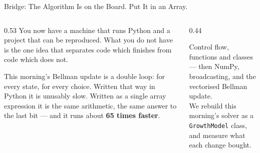 \begin{frame}{Bridge: The Algorithm Is on the Board. Put It in an Array.}
\begin{columns}[T]
\begin{column}{0.53\textwidth}
\small
You now have a machine that runs Python and a project that can be reproduced. What you do not have is the one idea that separates code which finishes from code which does not.
\medskip

This morning's Bellman update is a double loop: for every state, for every choice. Written that way in Python it is unusably slow. Written as a single array expression it is the same arithmetic, the same answer to the last bit --- and it runs about \textbf{65 times faster}.
\end{column}
\begin{column}{0.44\textwidth}
\begin{conceptbox}[title=\textbf{Next (3.B2)}]\small
Control flow, functions and classes --- then NumPy, broadcasting, and the vectorised Bellman update.\\[1mm]
We rebuild this morning's solver as a \texttt{GrowthModel} class, and measure what each change bought.
\end{conceptbox}
\end{column}
\end{columns}
\end{frame}


